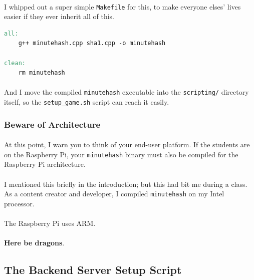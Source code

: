 \documentclass[11pt]{article}
\begin{document}
	\newpage

	\paragraph{} I whipped out a super simple \texttt{Makefile} for this, to make everyone elses' lives easier if they ever inherit all of this.

	\begin{lstlisting}[language=make]
all:
	g++ minutehash.cpp sha1.cpp -o minutehash

clean:
	rm minutehash
\end{lstlisting}

	\paragraph{} And I move the compiled \texttt{minutehash} executable into the \texttt{scripting/} directory itself, so the \texttt{setup\_game.sh} script can reach it easily.

	\subsubsection{Beware of Architecture}

	\paragraph{} At this point, I warn you to think of your end-user platform. If the students are on the Raspberry Pi, your \texttt{minutehash} binary must also be compiled for the Raspberry Pi architecture.

	\paragraph{} I mentioned this briefly in the introduction; but this had bit me during a class. As a content creator and developer, I compiled \texttt{minutehash} on my Intel processor. 

	\paragraph{} The Raspberry Pi uses ARM. 

	\paragraph{} \textbf{Here be dragons}.

	\subsection{The Backend Server Setup Script}
\end{document}
